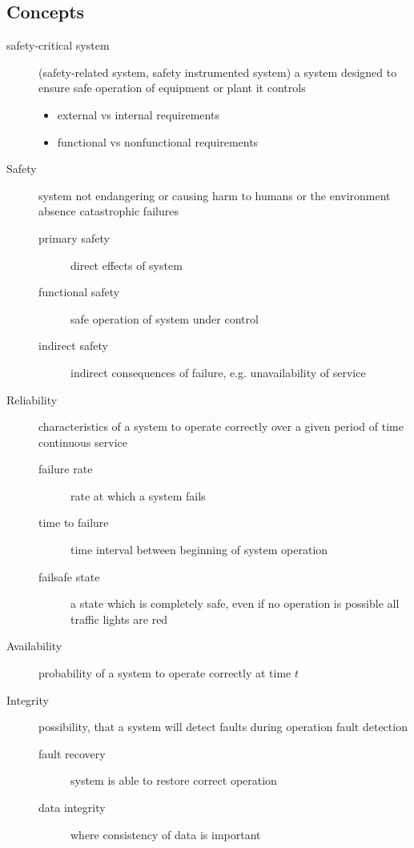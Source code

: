 \documentclass[a4paper, 10pt]{article}
\begin{document}
\subsection*{Concepts}
\begin{description}
    \item[safety-critical system] (safety-related system, safety instrumented system) a system designed to ensure safe operation of equipment or plant it controls
    \begin{itemize}
        \item external vs internal requirements
        \item functional vs nonfunctional requirements
    \end{itemize}
    \item[Safety] system not endangering or causing harm to humans or the environment \follows absence catastrophic failures
    \begin{description}
        \item[primary safety] direct effects of system
        \item[functional safety] safe operation of system under control
        \item[indirect safety] indirect consequences of failure, e.g. unavailability of service
    \end{description}
    \item[Reliability] characteristics of a system to operate correctly over a given period of time \follows continuous service
    \begin{description}
        \item[failure rate] rate at which a system fails
        \item[time to failure] time interval between beginning of system operation
        \item[failsafe state] a state which is completely safe, even if no operation is possible \follows all traffic lights are red
    \end{description}
    \item[Availability] probability of a system to operate correctly at time $t$
    \item[Integrity] possibility, that a system will detect faults during operation \follows fault detection
    \begin{description}
        \item[fault recovery] system is able to restore correct operation
        \item[data integrity] where consistency of data is important

\end{description}
\end{description}
\end{document}
